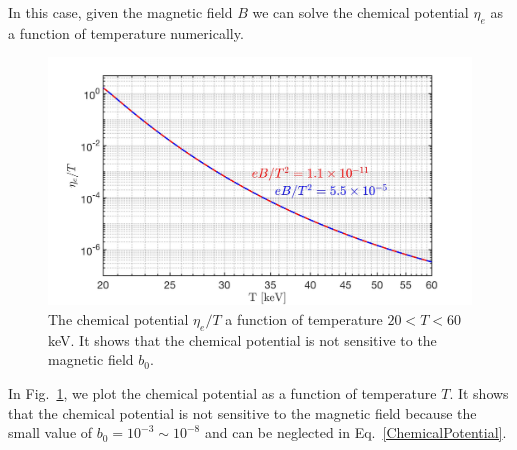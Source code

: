 \documentclass[Universe,article,submit,moreauthors,pdftex]{Definitions/mdpi}
\newcommand*{\req}[1]{Eq.~{\eqref{#1}}}
\newcommand*{\rf}[1]{Fig.~{\ref{#1}}}
\begin{document}
In this case, given the magnetic field $B$ we can solve the chemical potential $\eta_{e}$ as a function of temperature numerically.
\begin{figure}[h]
\centering
\includegraphics[width=0.75\linewidth]{ChemicalPotential_Final.jpg}
\caption{The chemical potential $\eta_{e}/T$ a function of temperature $20<T<60$keV.  It shows that the chemical potential is not sensitive to the magnetic field $b_0$.}
\label{chemical_fig} 
\end{figure}
In {\rf{chemical_fig}}, we plot the  chemical potential as a function of temperature $T$. It shows that the chemical potential is not sensitive to the magnetic field because the small value of $b_0=10^{-3}\sim10^{-8}$ and can be neglected in \req{ChemicalPotential}. 
\end{document}
